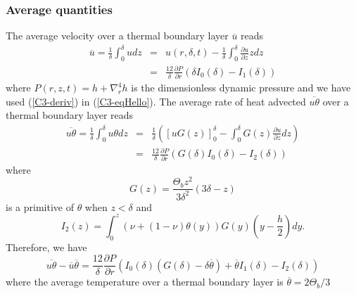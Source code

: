 \subsubsection{Average quantities}
The  average velocity  over  a thermal  boundary layer  $\overline{u}$
reads
\begin{eqnarray}
  \overline{u}        =\frac{1}{\delta}\int_0^{\delta}udz        &=&
                                                                     u(r,\delta,t) - \frac{1}{\delta}\int_0^{\delta}\frac{\partial
                                                                     u}{\partial
                                                                     z}
                                                                     zdz\label{C3-eqHello}\\
                                                                 &=&\frac{12}{\delta}
                                                                     \frac{\partial
                                                                     P}{\partial
                                                                     r}\left(\delta
                                                                     I_0(\delta)-I_1(\delta)\right)
\end{eqnarray}
where $P(r,z,t) = h+\nabla_r^4h$ is the dimensionless dynamic pressure
and we have used  (\ref{C3-deriv}) in (\ref{C3-eqHello}).  The average
rate  of heat  advected $\overline{u\theta}$  over a  thermal boundary
layer reads
\begin{eqnarray}
  \overline{u\theta}=\frac{1}{\delta}\int_0^{\delta}u\theta dz &=& \frac{1}{\delta}\left( [ uG(z) ]_{0}^{\delta} -\int_0^\delta
                                                                   G(z)\frac{\partial
                                                                   u}{\partial
                                                                   z}
                                                                   dz\right)\nonumber\\
                                                               &=&\frac{12}{\delta} \frac{\partial P}{\partial r}\left(G(\delta)I_0(\delta)-I_2(\delta)\right)
\end{eqnarray}
where
\begin{equation}
  G(z)= \frac{\Theta_{b} z^{2}}{3 \delta^{2}} \left( 3 \delta - z\right)
\end{equation}
is a primitive of $\theta$ when $z<\delta$ and
\begin{equation}
  I_2(z)=\int_0^z\left(\nu+(1-\nu)\theta(y)\right)G(y)
  \left(y-\frac{h}{2}\right)dy.
  \label{C3-I_3}
\end{equation}
Therefore, we have
\begin{equation}
  \overline{u\theta}-\overline{u}\overline{\theta}= \frac{12}{\delta} \frac{\partial P}{\partial r}\left(I_0(\delta)\left(G(\delta)-\delta\overline{\theta}\right)+\overline{\theta}I_1(\delta)-I_2(\delta)\right)
\end{equation} 
where  the  average  temperature  over a  thermal  boundary  layer  is
$ \overline{\theta} = 2\Theta_{b}/3$

